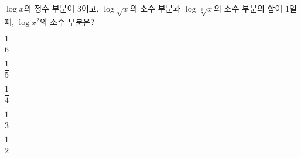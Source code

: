 $\log x$의 정수 부분이 $3$이고, $\log\sqrt{x}$의 소수 부분과 $\log\sqrt[3]{x}$의 소수 부분의 합이 $1$일 때, $\log x^2$의 소수 부분은?
\begin{choices32}{\rule[-3ex]{0pt}{8ex}$\dfrac{1}{6}$}{\rule[-3ex]{0pt}{8ex}$\dfrac{1}{5}$}{\rule[-3ex]{0pt}{8ex}$\dfrac{1}{4}$}{\rule[-3ex]{0pt}{8ex}$\dfrac{1}{3}$}{\rule[-3ex]{0pt}{8ex}$\dfrac{1}{2}$}\end{choices32}
